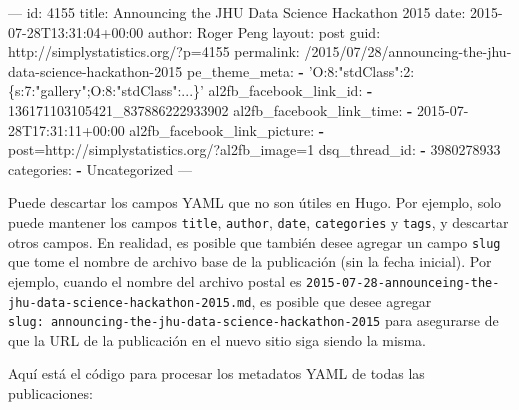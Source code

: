 \documentclass[12pt,]{krantz}
\makeatletter
\newenvironment{Shaded}{\begin{snugshade}}{\end{snugshade}}
\newcommand{\AttributeTok}[1]{\textcolor[rgb]{0.77,0.63,0.00}{#1}}
\newcommand{\FunctionTok}[1]{\textcolor[rgb]{0.00,0.00,0.00}{#1}}
\newcommand{\KeywordTok}[1]{\textcolor[rgb]{0.13,0.29,0.53}{\textbf{#1}}}
\newcommand{\NormalTok}[1]{#1}
\newcommand{\OtherTok}[1]{\textcolor[rgb]{0.56,0.35,0.01}{#1}}
\newcommand{\StringTok}[1]{\textcolor[rgb]{0.31,0.60,0.02}{#1}}
\newenvironment{kframe}{%
\medskip{}
\setlength{\fboxsep}{.8em}
 \def\at@end@of@kframe{}%
 \ifinner\ifhmode%
  \def\at@end@of@kframe{\end{minipage}}%
  \begin{minipage}{\columnwidth}%
 \fi\fi%
 \def\FrameCommand##1{\hskip\@totalleftmargin \hskip-\fboxsep
 \colorbox{shadecolor}{##1}\hskip-\fboxsep
     \hskip-\linewidth \hskip-\@totalleftmargin \hskip\columnwidth}%
 \MakeFramed {\advance\hsize-\width
   \@totalleftmargin\z@ \linewidth\hsize
   \@setminipage}}%
 {\par\unskip\endMakeFramed%
 \at@end@of@kframe}
\renewenvironment{Shaded}{\begin{kframe}}{\end{kframe}}
\theoremstyle{definition}
\theoremstyle{definition}
\theoremstyle{definition}
\theoremstyle{remark}
\makeatother
\begin{document}
\begin{Shaded}
\begin{Highlighting}[]
\OtherTok{---}
\FunctionTok{id:}\AttributeTok{ 4155}
\FunctionTok{title:}\AttributeTok{ Announcing the JHU Data Science Hackathon 2015}
\FunctionTok{date:}\AttributeTok{ 2015-07-28T13:31:04+00:00}
\FunctionTok{author:}\AttributeTok{ Roger Peng}
\FunctionTok{layout:}\AttributeTok{ post}
\FunctionTok{guid:}\AttributeTok{ http://simplystatistics.org/?p=4155}
\FunctionTok{permalink:}\AttributeTok{ /2015/07/28/announcing-the-jhu-data-science-hackathon-2015}
\FunctionTok{pe_theme_meta:}
  \KeywordTok{-} \StringTok{'O:8:"stdClass":2:\{s:7:"gallery";O:8:"stdClass":...\}'}
\FunctionTok{al2fb_facebook_link_id:}
  \KeywordTok{-}\NormalTok{ 136171103105421_837886222933902}
\FunctionTok{al2fb_facebook_link_time:}
  \KeywordTok{-} \FunctionTok{2015-07-28T17:}\AttributeTok{31:11+00:00}
\FunctionTok{al2fb_facebook_link_picture:}
  \KeywordTok{-} \FunctionTok{post=http:}\AttributeTok{//simplystatistics.org/?al2fb_image=1}
\FunctionTok{dsq_thread_id:}
  \KeywordTok{-}\NormalTok{ 3980278933}
\FunctionTok{categories:}
  \KeywordTok{-}\NormalTok{ Uncategorized}
\OtherTok{---}
\end{Highlighting}
\end{Shaded}

Puede descartar los campos YAML que no son útiles en Hugo. Por ejemplo,
solo puede mantener los campos \texttt{title}, \texttt{author},
\texttt{date}, \texttt{categories} y \texttt{tags}, y descartar otros
campos. En realidad, es posible que también desee agregar un campo
\texttt{slug} que tome el nombre de archivo base de la publicación (sin
la fecha inicial). Por ejemplo, cuando el nombre del archivo postal es
\texttt{2015-07-28-announceing-the-jhu-data-science-hackathon-2015.md},
es posible que desee agregar
\texttt{slug:\ announcing-the-jhu-data-science-hackathon-2015} para
asegurarse de que la URL de la publicación en el nuevo sitio siga siendo
la misma.

Aquí está el código para procesar los metadatos YAML de todas las
publicaciones:
\end{document}
